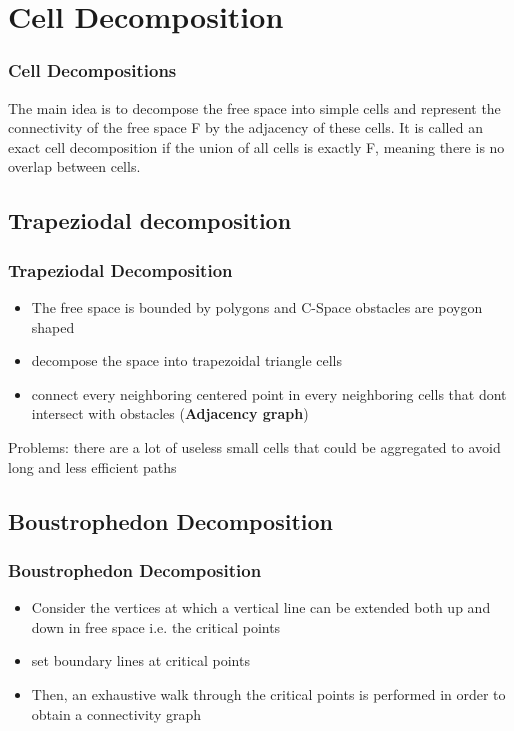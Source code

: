 \documentclass[handout]{beamer}
\begin{document}
  \section[Cell Decompositions]{Cell Decomposition}

  \begin{frame}
    \frametitle{Cell Decompositions}
    The main idea is to decompose the free space into simple cells and represent the connectivity of the free space F by the adjacency of these cells. It is called an exact cell decomposition if the union of all cells is exactly F, meaning there is no overlap between cells.
  \end{frame}

  \subsection{Trapeziodal decomposition}

  \begin{frame}
    \frametitle{Trapeziodal Decomposition}
    \begin{itemize}
      \item The free space is bounded by polygons and C-Space obstacles are poygon shaped
      \item decompose the space into trapezoidal triangle cells
      \item connect every neighboring centered point in every neighboring cells that dont intersect with obstacles (\textbf{Adjacency graph})
    \end{itemize}
    \alert{Problems:} there are a lot of useless small cells that could be aggregated to avoid long and less efficient paths
  
  \end{frame}

  \subsection{Boustrophedon Decomposition}

  \begin{frame}
    \frametitle{Boustrophedon Decomposition}
    \begin{itemize}
      \item Consider the vertices at which a vertical line can be extended both up and down in free space i.e. the critical points
      \item set boundary lines at critical points
      \item Then, an exhaustive walk through the critical
      points is performed in order to obtain a connectivity graph
    \end{itemize}    
  
  \end{frame}
\end{document}
